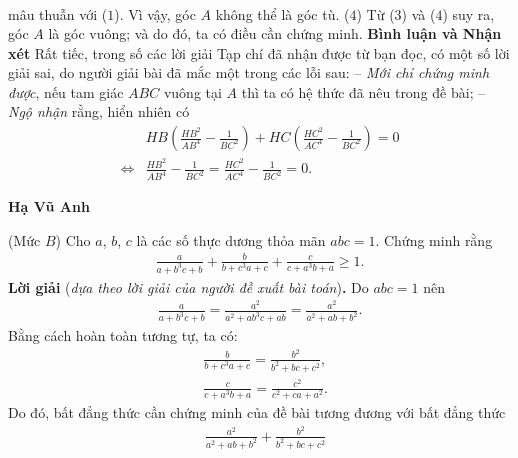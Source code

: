 \begin{multicols}{2}
\begin{align*}
	\end{align*}
	mâu thuẫn với ($1$). Vì vậy, góc $A$ không thể là góc tù.  \hfill ($4$)
	\vskip 0.05cm
	Từ ($3$) và ($4$) suy ra, góc $A$ là góc vuông; và do đó, ta có điều cần chứng minh.
	\vskip 0.05cm
	\textbf{\color{thachthuctoanhoc}Bình luận và Nhận xét}
	\vskip 0.05cm
	Rất tiếc, trong số các lời giải Tạp chí đã nhận được từ bạn đọc, có một số lời giải sai, do người giải bài đã mắc một trong các lỗi sau:
	\vskip 0.05cm
	-- \textit{Mới chỉ chứng minh được}, nếu tam giác $ABC$ vuông tại $A$ thì ta có hệ thức đã nêu trong đề bài;
	\vskip 0.05cm
	-- \textit{Ngộ nhận} rằng, hiển nhiên có
	\begin{align*}
		&HB\!\left(\!\!\!\frac{{H{B^2}}}{{A{B^4}}} \!-\! \frac{1}{{B{C^2}}}\!\!\! \right)\!\!+\! HC \! \left(\!\!\!\frac{{H{C^2}}}{{A{C^4}}} \!-\! \frac{1}{{B{C^2}}} \!\!\!\right) \!\!=\! 0\\
		\Leftrightarrow &\frac{{H{B^2}}}{{A{B^4}}} - \frac{1}{{B{C^2}}} = \frac{{H{C^2}}}{{A{C^4}}} - \frac{1}{{B{C^2}}} = 0.
	\end{align*}
	\begin{flushright}
		\textbf{\color{thachthuctoanhoc}Hạ Vũ Anh}
	\end{flushright}
	{}
	(Mức $B$)
	Cho $a$, $b$, $c$ là các số thực dương thỏa mãn $abc = 1$. Chứng minh rằng
	\begin{align*}
		\frac{a}{{a \!+ \!{b^3}c \!+\! b}} \!+\! \frac{b}{{b \!+\! {c^3}a \!+\! c}} \!+\! \frac{c}{{c \!+\! {a^3}b \!+\! a}} \ge 1.
	\end{align*}
	\textbf{\color{thachthuctoanhoc}Lời giải} (\textit{dựa theo lời giải của người đề xuất bài toán})\textbf{\color{thachthuctoanhoc}.}
	\vskip 0.05cm
	Do $abc = 1$ nên
	\begin{align*}
		\frac{a}{{a \!+\! {b^3}c \!+\! b}} \!=\! \frac{{{a^2}}}{{{a^2} \!+\! a{b^3}c \!+\! ab}} \!=\! \frac{{{a^2}}}{{{a^2} \!+\! ab \!+\! {b^2}}}.
	\end{align*}
	Bằng cách hoàn toàn tương tự, ta có:
	\begin{align*}
		&\frac{b}{{b + {c^3}a + c}} = \frac{{{b^2}}}{{{b^2} + bc + {c^2}}},\\ &\frac{c}{{c + {a^3}b + a}} = \frac{{{c^2}}}{{{c^2} + ca + {a^2}}}.
	\end{align*}
	Do đó, bất đẳng thức cần chứng minh của đề bài tương đương với bất đẳng thức
	\begin{align*}
		&\frac{{{a^2}}}{{{a^2} + ab + {b^2}}} + \frac{{{b^2}}}{{{b^2} + bc + {c^2}}} \\

\end{align*}
\end{multicols}
